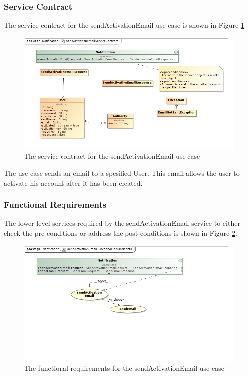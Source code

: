 \subsubsection{Service Contract}
The service contract for the sendActivationEmail use case is shown in Figure \ref{sendActivationEmailServiceContract}
\begin{figure}[H]
	\begin{center}
		\includegraphics[scale=0.5]{../Diagrams and Charts/Notifications/sendActivationEmailServiceContract.jpg}
		\caption{The service contract for the sendActivationEmail use case}
		\label{sendActivationEmailServiceContract}
	\end{center}	
\end{figure}

The use case sends an email to a spesified User. This email allows the user to
activate his account after it has been created.

\subsubsection{Functional Requirements}
The lower level services required by the sendActivationEmail service to either check the
pre-conditions or address the post-conditions is shown in Figure
\ref{sendActivationEmailFunctionalRequirements}.
\begin{figure}[H]
	\begin{center}
		\includegraphics[scale=0.5]{../Diagrams and Charts/Notifications/sendActivationEmailFunctionalRequirements.jpg}
		\caption{The functional requirements for the sendActivationEmail use case}
		\label{sendActivationEmailFunctionalRequirements}
	\end{center}	
\end{figure}

